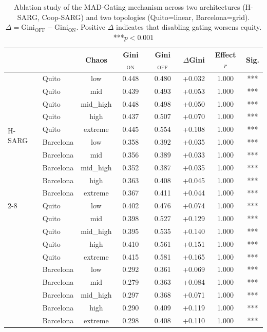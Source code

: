 \begin{table}[t]
\centering
\caption{Ablation study of the MAD-Gating mechanism across two architectures (H-SARG, Coop-SARG) and two topologies (Quito=linear, Barcelona=grid). $\Delta = \text{Gini}_\text{OFF} - \text{Gini}_\text{ON}$. Positive $\Delta$ indicates that disabling gating worsens equity. ***$p<0.001$}
\label{tab:mad_gating_ablation}
\begin{tabular}{llcccccc}
\toprule
& & \textbf{Chaos} & \textbf{Gini}$_\text{ON}$ & \textbf{Gini}$_\text{OFF}$ & $\Delta$Gini & \textbf{Effect} $r$ & \textbf{Sig.}\\
\midrule
  \multirow{10}{*}{H-SARG} & Quito & low & 0.448 & 0.480 & +0.032 & 1.000 & *** \\
   & Quito & mid & 0.439 & 0.493 & +0.053 & 1.000 & *** \\
   & Quito & mid_high & 0.448 & 0.498 & +0.050 & 1.000 & *** \\
   & Quito & high & 0.437 & 0.507 & +0.070 & 1.000 & *** \\
   & Quito & extreme & 0.445 & 0.554 & +0.108 & 1.000 & *** \\
   & Barcelona & low & 0.358 & 0.392 & +0.035 & 1.000 & *** \\
   & Barcelona & mid & 0.356 & 0.389 & +0.033 & 1.000 & *** \\
   & Barcelona & mid_high & 0.352 & 0.387 & +0.035 & 1.000 & *** \\
   & Barcelona & high & 0.363 & 0.408 & +0.045 & 1.000 & *** \\
   & Barcelona & extreme & 0.367 & 0.411 & +0.044 & 1.000 & *** \\
\cmidrule{2-8}
  \multirow{10}{*}{Coop-SARG} & Quito & low & 0.402 & 0.476 & +0.074 & 1.000 & *** \\
   & Quito & mid & 0.398 & 0.527 & +0.129 & 1.000 & *** \\
   & Quito & mid_high & 0.395 & 0.535 & +0.140 & 1.000 & *** \\
   & Quito & high & 0.410 & 0.561 & +0.151 & 1.000 & *** \\
   & Quito & extreme & 0.415 & 0.581 & +0.165 & 1.000 & *** \\
   & Barcelona & low & 0.292 & 0.361 & +0.069 & 1.000 & *** \\
   & Barcelona & mid & 0.279 & 0.363 & +0.084 & 1.000 & *** \\
   & Barcelona & mid_high & 0.297 & 0.368 & +0.071 & 1.000 & *** \\
   & Barcelona & high & 0.290 & 0.409 & +0.119 & 1.000 & *** \\
   & Barcelona & extreme & 0.298 & 0.408 & +0.110 & 1.000 & *** \\
\bottomrule
\end{tabular}
\end{table}